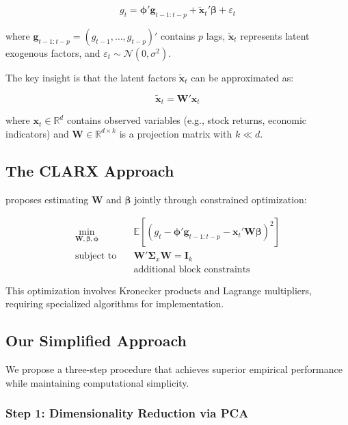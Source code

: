 \documentclass[11pt,letterpaper]{article}
\newcommand{\E}{\mathbb{E}}
\newcommand{\R}{\mathbb{R}}
\newcommand{\N}{\mathcal{N}}
\theoremstyle{plain}
\theoremstyle{definition}
\theoremstyle{remark}
\begin{document}
\begin{equation}
g_t = \bm{\phi}'\bm{g}_{t-1:t-p} + \tilde{\bm{x}}_t'\bm{\beta} + \varepsilon_t
\label{eq:baseline}
\end{equation}

where $\bm{g}_{t-1:t-p} = (g_{t-1}, \ldots, g_{t-p})'$ contains $p$ lags, $\tilde{\bm{x}}_t$ represents latent exogenous factors, and $\varepsilon_t \sim \N(0, \sigma^2)$.

The key insight is that the latent factors $\tilde{\bm{x}}_t$ can be approximated as:

\begin{equation}
\tilde{\bm{x}}_t = \bm{W}'\bm{x}_t
\label{eq:latent}
\end{equation}

where $\bm{x}_t \in \R^d$ contains observed variables (e.g., stock returns, economic indicators) and $\bm{W} \in \R^{d \times k}$ is a projection matrix with $k \ll d$.

\subsection{The CLARX Approach}

\citet{bargman2025} proposes estimating $\bm{W}$ and $\bm{\beta}$ jointly through constrained optimization:

\begin{align}
\min_{\bm{W}, \bm{\beta}, \bm{\phi}} \quad & \E\left[(g_t - \bm{\phi}'\bm{g}_{t-1:t-p} - \bm{x}_t'\bm{W}\bm{\beta})^2\right] \\
\text{subject to} \quad & \bm{W}'\bm{\Sigma}_x\bm{W} = \bm{I}_k \\
& \text{additional block constraints}
\end{align}

This optimization involves Kronecker products and Lagrange multipliers, requiring specialized algorithms for implementation.

\subsection{Our Simplified Approach}

We propose a three-step procedure that achieves superior empirical performance while maintaining computational simplicity.

\subsubsection{Step 1: Dimensionality Reduction via PCA}
\end{document}

